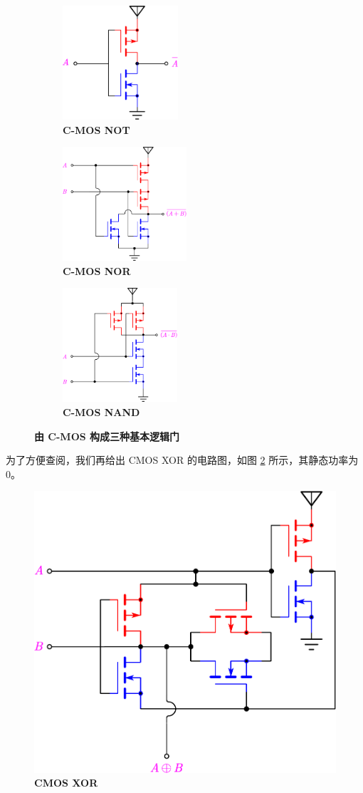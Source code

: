 \documentclass[UTF8]{report}
\theoremstyle{MyLineTheoremStyle} %
\theoremstyle{MyBlockTheoremStyle} %
\theoremstyle{MySubsubsectionStyle} %
\begin{document}
\begin{figure}[H]\centering
    \begin{subfigure}[t]{0.33\columnwidth}\centering
        \includegraphics[height=120pt]{assets/2/CMOS NOT.pdf}
        \caption{\bfseries C-MOS NOT }
    \end{subfigure}\hfill
    \begin{subfigure}[t]{0.33\columnwidth}\centering
        \includegraphics[height=120pt]{assets/2/CMOS NOR.pdf}
        \caption{\bfseries C-MOS NOR }
    \end{subfigure}
    \begin{subfigure}[t]{0.33\columnwidth}\centering
        \includegraphics[height=120pt]{assets/2/CMOS NAND.pdf}
        \caption{\bfseries C-MOS NAND }
    \end{subfigure}
    \caption{\bfseries 由 C-MOS 构成三种基本逻辑门 }\label{由 C-MOS 构成三种基本逻辑门}
    \end{figure}

为了方便查阅，我们再给出 CMOS XOR 的电路图，如图 \ref{CMOS XOR} 所示，其静态功率为 0。

\begin{figure}[H]\centering
\includegraphics[width=0.42\columnwidth]{assets/2/CMOS XOR.pdf}
\caption{\bfseries CMOS XOR }\label{CMOS XOR}
\end{figure}
\end{document}

